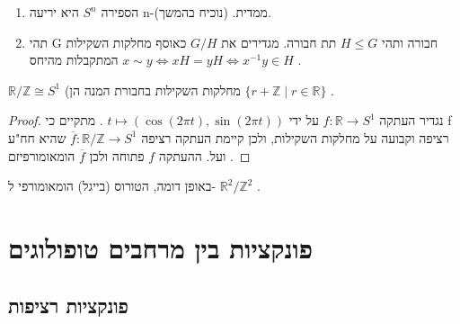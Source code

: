 \documentclass{tstextbook}
\begin{document}
\begin{enumerate}
  \item הספירה \(S^{n}\) היא יריעה n-ממדית. (נוכיח בהמשך). 


  \item תהי G חבורה ותהי \(H\le G\) תת חבורה. מגדירים את \(G/H\) כאוסף מחלקות השקילות המתקבלות מהיחס \(x\sim y \iff xH=yH \iff x^{-1}y\in H\) . 


\end{enumerate}
\begin{proposition}
\(\mathbb{R}/\mathbb{Z}\cong S^{1}\) (מחלקות השקילות בחבורת המנה הן \(\{r+\mathbb{Z} \mid r\in\mathbb{R}\}\) .

\end{proposition}
\begin{proof}
נגדיר העתקה \(f:\mathbb{R}\rightarrow S^{1}\) על ידי \(t\mapsto(\cos(2\pi t),\sin(2\pi t))\) .
מתקיים כי f רציפה וקבועה על מחלקות השקילות, ולכן קיימת העתקה רציפה \(\overline{f}:\mathbb{R}/\mathbb{Z}\rightarrow S^{1}\) שהיא חח"ע ועל. ההעתקה \(f\) פתוחה ולכן \(\overline{f}\) הומאומורפיזם .

\end{proof}
\begin{remark}
באופן דומה, הטורוס (בייגל) הומאומורפי ל- \(\mathbb{R}^{2}/\mathbb{Z}^{2}\) .

\end{remark}
\chapter{פונקציות בין מרחבים טופולוגים}

\section{פונקציות רציפות}
\end{document}
